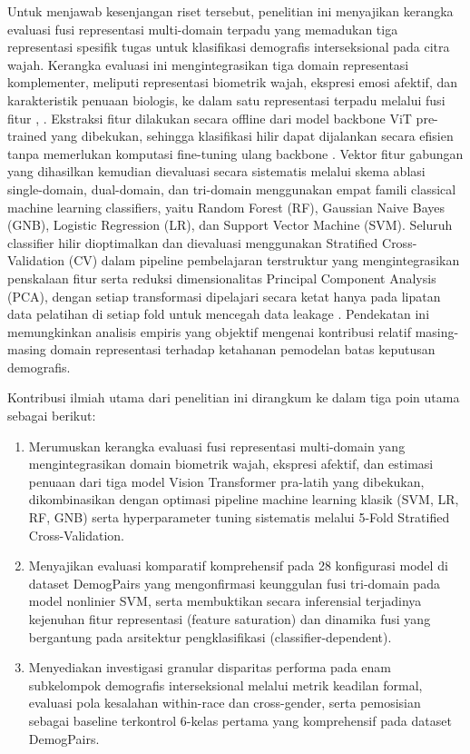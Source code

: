 Untuk menjawab kesenjangan riset tersebut, penelitian ini menyajikan kerangka evaluasi fusi representasi multi-domain terpadu yang memadukan tiga representasi spesifik tugas untuk klasifikasi demografis interseksional pada citra wajah. Kerangka evaluasi ini mengintegrasikan tiga domain representasi komplementer, meliputi representasi biometrik wajah, ekspresi emosi afektif, dan karakteristik penuaan biologis, ke dalam satu representasi terpadu melalui fusi fitur \cite{ref21}, \cite{ref22}. Ekstraksi fitur dilakukan secara offline dari model backbone ViT pre-trained yang dibekukan, sehingga klasifikasi hilir dapat dijalankan secara efisien tanpa memerlukan komputasi fine-tuning ulang backbone \cite{ref23}. Vektor fitur gabungan yang dihasilkan kemudian dievaluasi secara sistematis melalui skema ablasi single-domain, dual-domain, dan tri-domain menggunakan empat famili classical machine learning classifiers, yaitu Random Forest (RF), Gaussian Naive Bayes (GNB), Logistic Regression (LR), dan Support Vector Machine (SVM). Seluruh classifier hilir dioptimalkan dan dievaluasi menggunakan Stratified Cross-Validation (CV) dalam pipeline pembelajaran terstruktur yang mengintegrasikan penskalaan fitur serta reduksi dimensionalitas Principal Component Analysis (PCA), dengan setiap transformasi dipelajari secara ketat hanya pada lipatan data pelatihan di setiap fold untuk mencegah data leakage \cite{ref24}. Pendekatan ini memungkinkan analisis empiris yang objektif mengenai kontribusi relatif masing-masing domain representasi terhadap ketahanan pemodelan batas keputusan demografis.

Kontribusi ilmiah utama dari penelitian ini dirangkum ke dalam tiga poin utama sebagai berikut:
\begin{enumerate}
\item Merumuskan kerangka evaluasi fusi representasi multi-domain yang mengintegrasikan domain biometrik wajah, ekspresi afektif, dan estimasi penuaan dari tiga model Vision Transformer pra-latih yang dibekukan, dikombinasikan dengan optimasi pipeline machine learning klasik (SVM, LR, RF, GNB) serta hyperparameter tuning sistematis melalui 5-Fold Stratified Cross-Validation.
\item Menyajikan evaluasi komparatif komprehensif pada 28 konfigurasi model di dataset DemogPairs yang mengonfirmasi keunggulan fusi tri-domain pada model nonlinier SVM, serta membuktikan secara inferensial terjadinya kejenuhan fitur representasi (feature saturation) dan dinamika fusi yang bergantung pada arsitektur pengklasifikasi (classifier-dependent).
\item Menyediakan investigasi granular disparitas performa pada enam subkelompok demografis interseksional melalui metrik keadilan formal, evaluasi pola kesalahan within-race dan cross-gender, serta pemosisian sebagai baseline terkontrol 6-kelas pertama yang komprehensif pada dataset DemogPairs.
\end{enumerate}

